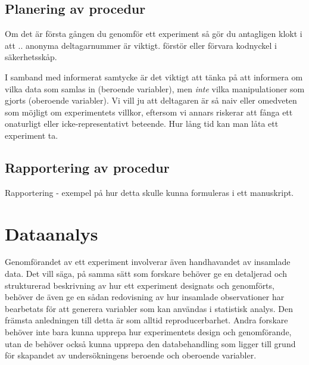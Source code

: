 \documentclass[
]{book}
\begin{document}
\hypertarget{sub07.6.8}{%
\subsection{Planering av procedur}\label{sub07.6.8}}

Om det är första gången du genomför ett experiment så gör du antagligen klokt i att .. anonyma deltagarnummer är viktigt. förstör eller förvara kodnyckel i säkerhetsskåp.

I samband med informerat samtycke är det viktigt att tänka på att informera om vilka data som samlas in (beroende variabler), men \emph{inte} vilka manipulationer som gjorts (oberoende variabler). Vi vill ju att deltagaren är så naiv eller omedveten som möjligt om experimentets villkor, eftersom vi annars riskerar att fånga ett onaturligt eller icke-representativt beteende. Hur lång tid kan man låta ett experiment ta.

\hypertarget{sub07.6.9}{%
\subsection{Rapportering av procedur}\label{sub07.6.9}}

Rapportering - exempel på hur detta skulle kunna formuleras i ett manuskript.

\hypertarget{sec07.7}{%
\section{Dataanalys}\label{sec07.7}}

Genomförandet av ett experiment involverar även handhavandet av insamlade data. Det vill säga, på samma sätt som forskare behöver ge en detaljerad och strukturerad beskrivning av hur ett experiment designats och genomförts, behöver de även ge en sådan redovisning av hur insamlade observationer har bearbetats för att generera variabler som kan användas i statistisk analys. Den främsta anledningen till detta är som alltid reproducerbarhet. Andra forskare behöver inte bara kunna upprepa hur experimentets design och genomförande, utan de behöver också kunna upprepa den databehandling som ligger till grund för skapandet av undersökningens beroende och oberoende variabler.
\end{document}
